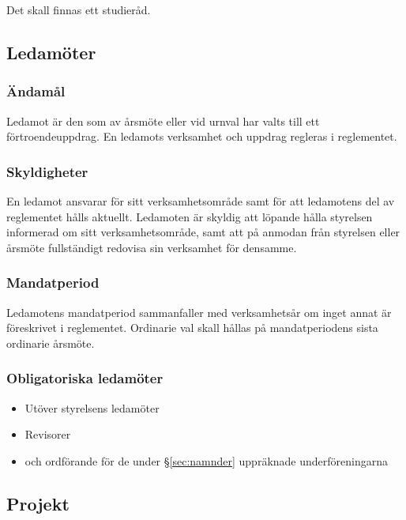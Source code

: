 \documentclass{../resources/dgovdoc}
\begin{document}
Det skall finnas ett studieråd.

\subsection{Ledamöter}

\subsubsection{Ändamål}

Ledamot är den som av årsmöte eller vid urnval har valts till ett
förtroendeuppdrag. En ledamots verksamhet och uppdrag regleras i
reglementet.

\subsubsection{Skyldigheter}

En ledamot ansvarar för sitt verksamhetsområde samt för att ledamotens del
av reglementet hålls aktuellt. Ledamoten är skyldig att löpande hålla
styrelsen informerad om sitt verksamhetsområde, samt att på anmodan från
styrelsen eller årsmöte fullständigt redovisa sin verksamhet för densamme.

\subsubsection{Mandatperiod}

Ledamotens mandatperiod sammanfaller med verksamhetsår om inget annat är
föreskrivet i reglementet. Ordinarie val skall hållas på mandatperiodens sista
ordinarie årsmöte.

\subsubsection{Obligatoriska ledamöter}

\begin{itemize}

  \item Utöver styrelsens ledamöter 
  \item Revisorer 
  \item och ordförande för de under \S\ref{sec:namnder} uppräknade underföreningarna

\end{itemize}

\subsection{Projekt}
\end{document}
